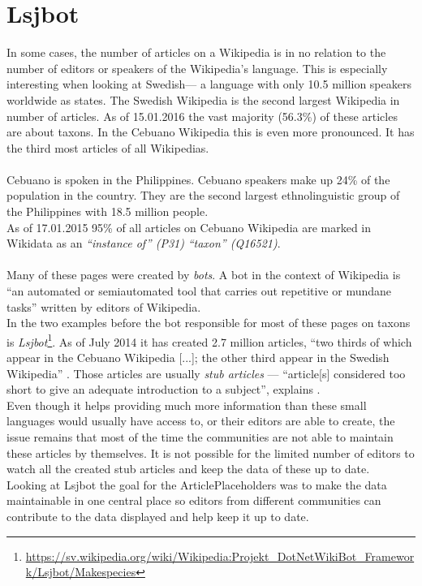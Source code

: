 \section{Lsjbot}
In some cases, the number of articles on a Wikipedia is in no relation to the number of editors or speakers of the Wikipedia's language. This is especially interesting when looking at Swedish--- a language with only 10.5 million speakers worldwide as \citet{nlpd:01} states. The Swedish Wikipedia is the second largest Wikipedia in number of articles. As of 15.01.2016 the vast majority (56.3\%) of these articles are about taxons.
In the Cebuano Wikipedia this is even more pronounced. It has the third most articles of all Wikipedias. \citep{wiki:07} \\
\\
Cebuano is spoken in the Philippines. Cebuano speakers make up 24\% of the population in the country. \citep{cebuano:01} They are the second largest ethnolinguistic group of the Philippines with 18.5 million people. \citep{cebuano:02} \\
As of 17.01.2015 95\% of all articles on Cebuano Wikipedia are marked in Wikidata as an \textit{``instance of'' (P31)} \textit{``taxon'' (Q16521)}. \citep{wiki:07} \\
\\
Many of these pages were created by \textit{bots}. A bot in the context of Wikipedia is ``an automated or semiautomated tool that carries out repetitive or mundane tasks'' \citep{wiki:08} written by editors of Wikipedia. \\
In the two examples before the bot responsible for most of these pages on taxons is \textit{Lsjbot}\footnote{\url{https://sv.wikipedia.org/wiki/Wikipedia:Projekt_DotNetWikiBot_Framework/Lsjbot/Makespecies}}. As of July 2014 it has created 2.7 million articles, ``two thirds of which appear in the Cebuano Wikipedia [...]; the other third appear in the Swedish Wikipedia'' \citep{wiki:09}. Those articles are usually \textit{stub articles} --- ``article[s] considered too short to give an adequate introduction to a subject'', explains \citet{stubs}. \\
Even though it helps providing much more information than these small languages would usually have access to, or their editors are able to create, the issue remains that most of the time the communities are not able to maintain these articles by themselves. It is not possible for the limited number of editors to watch all the created stub articles and keep the data of these up to date. \\
Looking at Lsjbot the goal for the ArticlePlaceholders was to make the data maintainable in one central place so editors from different communities can contribute to the data displayed and help keep it up to date.

